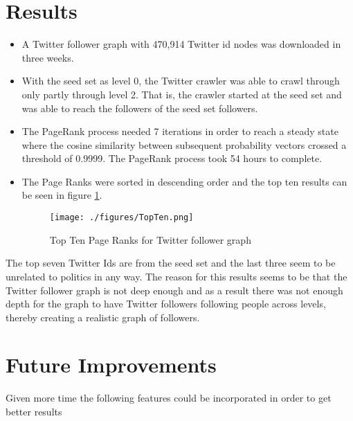 \documentclass{sig-alternate-05-2015}
\begin{document}
\section{Results}

\begin{itemize}

\item A Twitter follower graph with 470,914 Twitter id nodes was downloaded in three weeks.

\item With the seed set as level 0, the Twitter crawler was able to crawl through only partly through level 2. That is, the crawler started at the seed set and was able to reach the followers of the seed set followers.

\item The PageRank process needed 7 iterations in order to reach a steady state where the cosine similarity between subsequent probability vectors crossed a threshold of 0.9999. The PageRank process took 54 hours to complete.

\item The Page Ranks were sorted in descending order and the top ten results can be seen in figure \ref{TopTenTable}.

\begin{figure}[!t]
\centering
\texttt{[image: ./figures/TopTen.png]}
\caption{Top Ten Page Ranks for Twitter follower graph}
\label{TopTenTable}
\end{figure}

\end{itemize}

The top seven Twitter Ids are from the seed set and the last three seem to be unrelated to politics in any way. The reason for this results seems to be that the Twitter follower graph is not deep enough and as a result there was not enough depth for the graph to have Twitter followers following people across levels, thereby creating a realistic graph of followers.

\section{Future Improvements}

Given more time the following features could be incorporated in order to get better results
\end{document}
